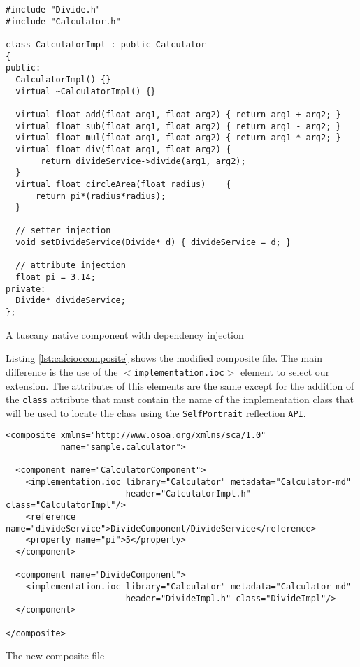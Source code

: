 \begin{listing}[!htbp]
\begin{verbatim}
#include "Divide.h"
#include "Calculator.h"

class CalculatorImpl : public Calculator
{
public:
  CalculatorImpl() {}
  virtual ~CalculatorImpl() {}

  virtual float add(float arg1, float arg2) { return arg1 + arg2; }
  virtual float sub(float arg1, float arg2) { return arg1 - arg2; }
  virtual float mul(float arg1, float arg2) { return arg1 * arg2; }
  virtual float div(float arg1, float arg2) {
       return divideService->divide(arg1, arg2);
  }
  virtual float circleArea(float radius)    {
      return pi*(radius*radius);
  }

  // setter injection
  void setDivideService(Divide* d) { divideService = d; }

  // attribute injection
  float pi = 3.14;
private:
  Divide* divideService;
};
\end{verbatim}
\caption{A tuscany native component with dependency injection}
\label{lst:calcioccpp}
\end{listing}

Listing \ref{lst:calcioccomposite} shows the modified composite file. The main difference
is the use of the \texttt{$<$implementation.ioc$>$} element to select our extension. The attributes
of this elements are the same except for the addition of the \texttt{class} attribute that must
contain the name of the implementation class that will be used to locate the class using the
\texttt{SelfPortrait} reflection \texttt{API}.

\begin{listing}[!htbp]
\begin{verbatim}
<composite xmlns="http://www.osoa.org/xmlns/sca/1.0"
           name="sample.calculator">

  <component name="CalculatorComponent">
    <implementation.ioc library="Calculator" metadata="Calculator-md"
                        header="CalculatorImpl.h" class="CalculatorImpl"/>
    <reference name="divideService">DivideComponent/DivideService</reference>
    <property name="pi">5</property>
  </component>
        
  <component name="DivideComponent">
    <implementation.ioc library="Calculator" metadata="Calculator-md"
                        header="DivideImpl.h" class="DivideImpl"/>
  </component>

</composite>
\end{verbatim}
\caption{The new composite file}
\label{lst:calcioccomposite}
\end{listing}

